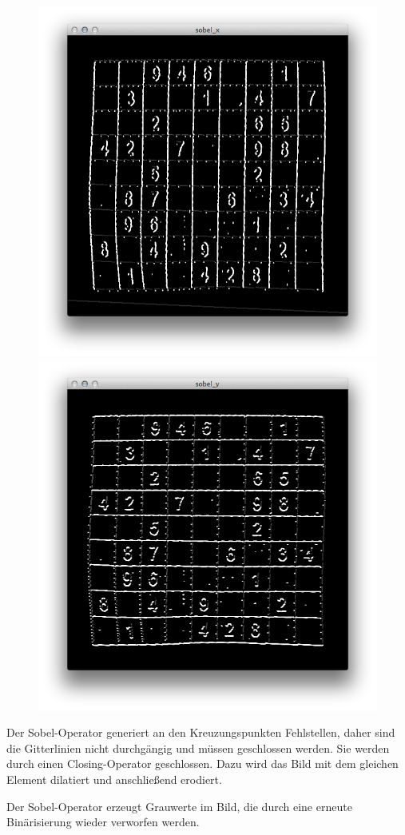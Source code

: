 \begin{figure}[h!]
    \begin{center}
        \includegraphics[width=.5\textwidth]{Abbildungen/sobel_x}
        \includegraphics[width=.5\textwidth]{Abbildungen/sobel_y}
    \end{center}
\end{figure}

Der Sobel-Operator generiert an den Kreuzungspunkten Fehlstellen, daher sind die Gitterlinien nicht durchgängig und müssen geschlossen werden.
Sie werden durch einen Closing-Operator geschlossen.
Dazu wird das Bild mit dem gleichen Element dilatiert und anschließend erodiert.

Der Sobel-Operator erzeugt Grauwerte im Bild, die durch eine erneute Binärisierung wieder verworfen werden.

